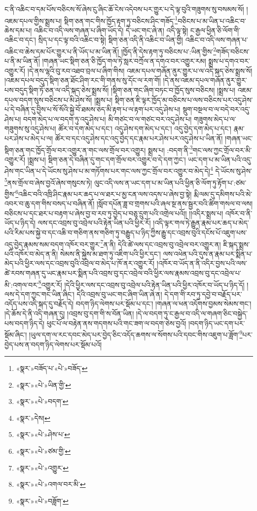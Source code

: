 ང་ནི་འཆིང་བ་དམ་པོས་བཅིངས་སོ་ཞེས་ངུ་ཞིང་ཆོ་ངེས་འདེབས་པར་གྱུར་པ་དེ་ལྟ་བུའི་གཟུགས་སུ་བསམས་སོ། །འཇམ་དཔལ་གྱིས་སྨྲས་པ། སྡིག་ཅན་གང་གིས་ཁྱོད་རྟག་ཏུ་བཅིངས་ཤིང་གཟོད་\footnote{«སྣར་»བཟོད་པ་«པེ་»བཟོད་}བཅིངས་པ་མ་ཡིན་པ་འཆིང་བ་ཆེས་དམ་པ། འཆིང་བ་འདི་ལས་གཞན་པ་ཞིག་ཡོད་དེ། དེ་ཡང་གང་ཞེ་ན། འདི་ལྟ་སྟེ། ང་རྒྱལ་ཕྱིན་ཅི་ལོག་གི་འཆིང་བ་དང་། སྲིད་པ་དང་ལྟ་བའི་འཆིང་བ་སྟེ། སྡིག་ཅན་འདི་ནི་འཆིང་བ་ཡིན་གྱི། འཆིང་བ་འདི་ལས་གཞན་པ་འཆིང་བ་ཆེས་དམ་པོར་གྱུར་པ་ནི་ཡོད་པ་མ་ཡིན་ནོ། །ཁྱོད་ནི་དེས་རྟག་ཏུ་བཅིངས་པ་:ཡིན་གྱིས་\footnote{«སྣར་»«པེ་»ཡིན་གྱི་}གཟོད་བཅིངས་པ་ནི་མ་ཡིན་ནོ། །གཞན་ཡང་སྡིག་ཅན་ཅི་ཁྱོད་གལ་ཏེ་སླར་བཀྲོལ་ན་དགའ་བར་འགྱུར་རམ། སྨྲས་པ་དགའ་བར་འགྱུར་རོ། །དེ་ནས་ལྷའི་བུ་རབ་འཐབ་བྲལ་པ་ཞིག་གིས། འཇམ་དཔལ་གཞོན་ནུར་གྱུར་པ་ལ་འདི་སྐད་ཅེས་སྨྲས་སོ། །འཇམ་དཔལ་བདུད་སྡིག་ཅན་ཐོང་ཤིག་རང་གི་གནས་སུ་དོང་ལ་རག་གོ། །དེ་ནས་འཇམ་དཔལ་གཞོན་ནུར་གྱུར་པས་བདུད་སྡིག་ཏོ་ཅན་ལ་འདི་སྐད་ཅེས་སྨྲས་སོ། །སྡིག་ཅན་གང་ཞིག་བཏང་བ་ཁྱོད་སུས་བཅིངས། །སྨྲས་པ། འཇམ་དཔལ་བདག་སུས་བཅིངས་པ་མི་ཤེས་སོ། །སྨྲས་པ། སྡིག་ཅན་ཇི་ལྟར་ཁྱོད་མ་བཅིངས་པ་ལས་བཅིངས་པར་འདུ་ཤེས་པ་དེ་བཞིན་དུ་བྱིས་པ་སོ་སོའི་སྐྱེ་བོ་ཐམས་ཅད་མི་རྟག་པ་ལ་རྟག་པར་འདུ་ཤེས་པ། སྡུག་བསྔལ་བ་ལ་བདེ་བར་འདུ་ཤེས་པ། བདག་མེད་པ་ལ་བདག་ཏུ་འདུ་ཤེས་པ། མི་གཙང་བ་ལ་གཙང་བར་འདུ་ཤེས་པ། གཟུགས་མེད་པ་ལ་གཟུགས་སུ་འདུ་ཤེས་པ། ཚོར་བ་དག་མེད་པ་དང་། འདུ་ཤེས་དག་མེད་པ་དང་། འདུ་བྱེད་དག་མེད་པ་དང་། རྣམ་པར་ཤེས་པ་མེད་པ་ལ། ཚོར་བ་དང་འདུ་ཤེས་དང་འདུ་བྱེད་དང་རྣམ་པར་ཤེས་པར་འདུ་ཤེས་པ་ཡིན་ནོ། །གཞན་ཡང་སྡིག་ཅན་གང་ཁྱོད་གྲོལ་བར་འགྱུར་ན་གང་ལས་གྲོལ་བར་འགྱུར། སྨྲས་པ། :བདག་ནི་\footnote{«སྣར་»«པེ་»བདག་}གང་ལས་ཀྱང་གྲོལ་བར་མི་འགྱུར་རོ། །སྨྲས་པ། སྡིག་ཅན་དེ་བཞིན་དུ་གང་དག་གྲོལ་བར་འགྱུར་བ་དེ་དག་ཀྱང་། ཡང་དག་པ་མ་ཡིན་པའི་འདུ་ཤེས་གང་ཡིན་པ་དེ་ཡོངས་སུ་ཤེས་པ་མ་གཏོགས་པར་གང་ལས་ཀྱང་གྲོལ་བར་འགྱུར་བ་མེད་དེ།\footnote{«སྣར་»དེས།} དེ་ཡོངས་སུ་ཤེས་\footnote{«སྣར་»«པེ་»ཤེས་པ་}ནས་གྲོལ་བ་ཞེས་བྱའོ་ཞེས་གསུངས་ཏེ། ལུང་འདི་ལས་ན་ཡང་དག་པ་མ་ཡིན་པའི་ཕྱིན་ཅི་ལོག་ཏུ་རྟོག་པ་:ཙམ་གྱིས་\footnote{«སྣར་»«པེ་»ཙམ་གྱི་}འཆིང་བའི་འཁྲི་ཤིང་རྣམ་པར་ཆད་པ་ལ་ཐར་པ་མྱ་ངན་ལས་འདས་པ་ཞེས་བྱ་སྟེ། རྨི་ལམ་དུ་དམིགས་པའི་མེ་འབར་བ་ཆུ་དག་གིས་བསད་པ་བཞིན་ནོ། །སློབ་དཔོན་ཟླ་བ་གྲགས་པའི་ཞལ་སྔ་ནས་སྦྱར་བའི་ཚིག་གསལ་བ་ལས། བཅིངས་པ་དང་ཐར་པ་བརྟག་པ་ཞེས་བྱ་བ་རབ་ཏུ་བྱེད་པ་བཅུ་དྲུག་པའི་འགྲེལ་པའོ།། །།འདིར་སྨྲས་པ། འཁོར་བ་ནི་ཡོད་པ་ཉིད་དེ། ལས་དང་འབྲས་བུ་འབྲེལ་པའི་རྟེན་ཡིན་པའི་ཕྱིར་རོ། །འདི་ལྟར་གལ་ཏེ་རྒྱུན་རྣམ་པར་ཆད་པ་མེད་པའི་རིམ་པས་སྐྱེ་བ་དང་འཆི་བ་གཅིག་ནས་གཅིག་ཏུ་བརྒྱུད་པ་ཉིད་ཀྱིས་རྒྱུ་དང་འབྲས་བུའི་དངོས་པོ་འཇུག་པས་འདུ་བྱེད་རྣམས་སམ་བདག་འཁོར་བར་གྱུར་\footnote{«སྣར་»«པེ་»འགྱུར་}ན་ནི། དེའི་ཚེ་ལས་དང་འབྲས་བུ་འབྲེལ་བར་འགྱུར་ན། ཇི་སྐད་སྨྲས་པའི་འཁོར་བ་མེད་ན་ནི། སེམས་ནི་སྐྱེས་མ་ཐག་ཏུ་འཇིག་པའི་ཕྱིར་དང་། ལས་འཕེན་པའི་དུས་ན་རྣམ་པར་སྨིན་པ་མེད་པའི་ཕྱིར་ལས་དང་འབྲས་བུའི་འབྲེལ་བ་མེད་པ་ཁོ་ནར་འགྱུར་རོ། །འཁོར་བ་ཡོད་ན་ནི་འདིར་བྱས་པའི་ལས་ཚེ་རབས་གཞན་དུ་ཡང་རྣམ་པར་སྨིན་པའི་འབྲས་བུ་དང་འབྲེལ་བའི་ཕྱིར་ལས་རྣམས་འབྲས་བུ་དང་འབྲེལ་པ་མི་:འགལ་བར་\footnote{«སྣར་»«པེ་»འགལ་བར་མི་}འགྱུར་རོ། །དེའི་ཕྱིར་ལས་དང་འབྲས་བུ་འབྲེལ་པའི་རྟེན་ཡིན་པའི་ཕྱིར་འཁོར་བ་ཡོད་པ་ཉིད་དོ། །ལས་དེ་དག་ཀྱང་གང་ཡིན་ཞིང་། དེའི་འབྲས་བུ་ཡང་གང་ཞིག་ཡིན་ཞེ་ན། དེ་དག་གི་རབ་ཏུ་དབྱེ་བ་བརྗོད་པར་འདོད་པས་འདི་སྐད་དུ་བརྗོད་དེ། བདག་ཉིད་ལེགས་པར་སྡོམ་པ་དང་། །གཞན་ལ་ཕན་འདོགས་བྱམས་སེམས་གང་། །དེ་ཆོས་དེ་ནི་འདི་གཞན་དུ། །འབྲས་བུ་དག་གི་ས་བོན་ཡིན། །དེ་ལ་བདག་ཏུ་ང་རྒྱལ་བ་འདི་ལ་གཞག་ཅིང་བསྐྱེད་པས་བདག་ཉིད་དེ། ཕུང་པོ་ལ་བརྟེན་ནས་གདགས་པའི་གང་ཟག་ལ་བདག་ཅེས་བྱའོ། །བདག་ཉིད་ཡང་དག་པར་སྡོམ་ཞིང་། །ཡུལ་དག་ལ་རང་དབང་མེད་པར་བྱེད་ཅིང་འདོད་ཆགས་ལ་སོགས་པའི་དབང་གིས་འཇུག་པ་ཟློག་\footnote{«སྣར་»«པེ་»བཟློག་}པར་བྱེད་པས་ན་བདག་ཉིད་ལེགས་པར་སྡོམ་པའོ། 